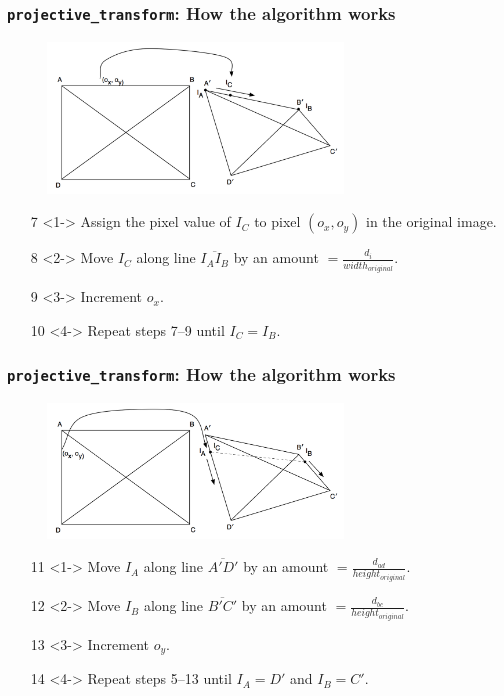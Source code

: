 \documentclass{beamer}
\begin{document}
\begin{frame}
	\frametitle{{\tt projective\_transform}: How the algorithm works}
	\begin{figure}
		\centering
		\includegraphics[width=0.7\textwidth]{images/arbiskew_graphic_with_iterators1.png}
	\end{figure}
	\begin{enumerate}
		\item[7]<1-> Assign the pixel value of $I_C$ to pixel $(o_x, o_y)$ in the original image.
		\item[8]<2-> Move $I_C$ along line $\overline{I_A I_B}$ by an amount $= \frac{d_i}{width_{original}}$.
		\item[9]<3-> Increment $o_x$.
		\item[10]<4-> Repeat steps 7--9 until $I_C = I_B$.
	\end{enumerate}
\end{frame}

\begin{frame}
	\frametitle{{\tt projective\_transform}: How the algorithm works}
	\begin{figure}
		\centering
		\includegraphics[width=0.7\textwidth]{images/arbiskew_graphic_with_iterators2.png}
	\end{figure}
	\begin{enumerate}
	\item[11]<1-> Move $I_A$ along line $\overline{A\prime D\prime}$ by an amount $= \frac{d_{ad}}{height_{original}}$.
	\item[12]<2-> Move $I_B$ along line $\overline{B\prime C\prime}$ by an amount $= \frac{d_{bc}}{height_{original}}$.
	\item[13]<3-> Increment $o_y$.
	\item[14]<4-> Repeat steps 5--13 until $I_A = D\prime$ and $I_B = C\prime$.
	\end{enumerate}
\end{frame}
\end{document}
